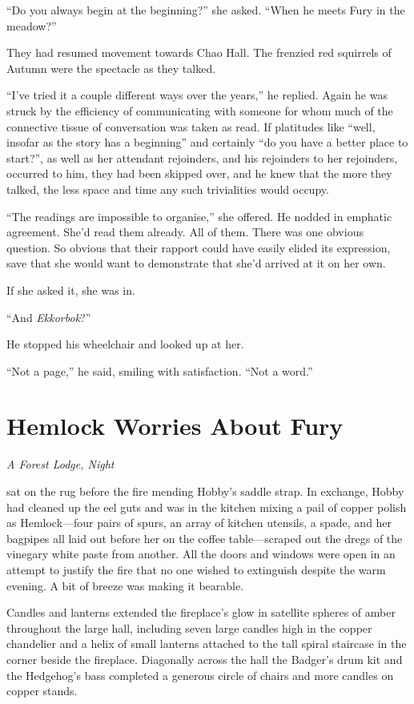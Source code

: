 \documentclass[11pt,a5paper]{article}
\newcommand{\alet}[1]{\textit{#1}\vspace{1em}}
\begin{document}
``Do you always begin at the beginning?'' she asked. ``When he meets Fury in the meadow?''

They had resumed movement towards Chao Hall. The frenzied red squirrels of Autumn were the spectacle as they talked.

``I've tried it a couple different ways over the years,'' he replied. Again he was struck by the efficiency of communicating with someone for whom much of the connective tissue of conversation was taken as read. If platitudes like ``well, insofar as the story has a beginning'' and certainly ``do you have a better place to start?'', as well as her attendant rejoinders, and his rejoinders to her rejoinders, occurred to him, they had been skipped over, and he knew that the more they talked, the less space and time any such trivialities would occupy.

``The readings are impossible to organise,'' she offered. He nodded in emphatic agreement. She'd read them already. All of them. There was one obvious question. So obvious that their rapport could have easily elided its expression, save that she would want to demonstrate that she'd arrived at it on her own.

If she asked it, she was in.

``And \emph{Ekkorbok}?''

He stopped his wheelchair and looked up at her.

``Not a page,'' he said, smiling with satisfaction. ``Not a word.''

\newpage

\section{Hemlock Worries About Fury}

\alet{A Forest Lodge, Night}

 sat on the rug before the fire mending Hobby's saddle strap. In exchange, Hobby had cleaned up the eel guts and was in the kitchen mixing a pail of copper polish as Hemlock---four pairs of spurs, an array of kitchen utensils, a spade, and her bagpipes all laid out before her on the coffee table---scraped out the dregs of the vinegary white paste from another. All the doors and windows were open in an attempt to justify the fire that no one wished to extinguish despite the warm evening. A bit of breeze was making it bearable.

Candles and lanterns extended the fireplace's glow in satellite spheres of amber throughout the large hall, including seven large candles high in the copper chandelier and a helix of small lanterns attached to the tall spiral staircase in the corner beside the fireplace. Diagonally across the hall the Badger's drum kit and the Hedgehog's bass completed a generous circle of chairs and more candles on copper stands.
\end{document}
